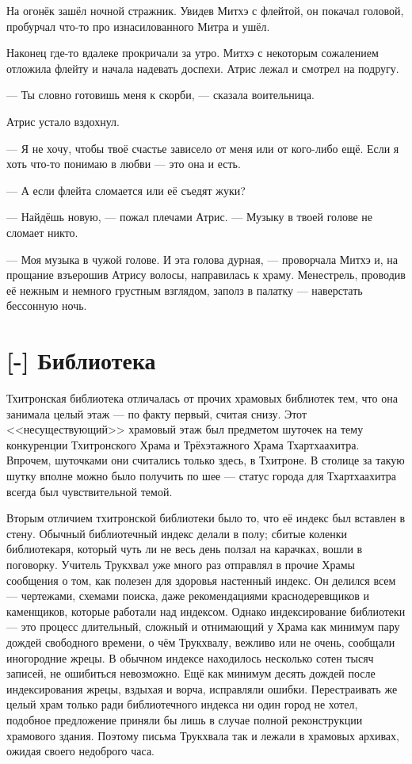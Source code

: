 На огонёк зашёл ночной стражник.
Увидев Митхэ с флейтой, он покачал головой, пробурчал что-то про изнасилованного Митра и ушёл.

Наконец где-то вдалеке прокричали за утро.
Митхэ с некоторым сожалением отложила флейту и начала надевать доспехи.
Атрис лежал и смотрел на подругу.

--- Ты словно готовишь меня к скорби, --- сказала воительница.

Атрис устало вздохнул.

--- Я не хочу, чтобы твоё счастье зависело от меня или от кого-либо ещё.
Если я хоть что-то понимаю в любви --- это она и есть.

--- А если флейта сломается или её съедят жуки?

--- Найдёшь новую, --- пожал плечами Атрис.
--- Музыку в твоей голове не сломает никто.

--- Моя музыка в чужой голове.
И эта голова дурная, --- проворчала Митхэ и, на прощание взъерошив Атрису волосы, направилась к храму.
Менестрель, проводив её нежным и немного грустным взглядом, заполз в палатку --- наверстать бессонную ночь.

\section{[-] Библиотека}

Тхитронская библиотека отличалась от прочих храмовых библиотек тем, что она занимала целый этаж --- по факту первый, считая снизу.
Этот <<несуществующий>> храмовый этаж был предметом шуточек на тему конкуренции Тхитронского Храма и Трёхэтажного Храма Тхартхаахитра.
Впрочем, шуточками они считались только здесь, в Тхитроне.
В столице за такую шутку вполне можно было получить по шее --- статус города для Тхартхаахитра всегда был чувствительной темой.

Вторым отличием тхитронской библиотеки было то, что её индекс был вставлен в стену.
Обычный библиотечный индекс делали в полу;
сбитые коленки библиотекаря, который чуть ли не весь день ползал на карачках, вошли в поговорку.
Учитель Трукхвал уже много раз отправлял в прочие Храмы сообщения о том, как полезен для здоровья настенный индекс.
Он делился всем --- чертежами, схемами поиска, даже рекомендациями краснодеревщиков и каменщиков, которые работали над индексом.
Однако индексирование библиотеки --- это процесс длительный, сложный и отнимающий у Храма как минимум пару дождей свободного времени, о чём Трукхвалу, вежливо или не очень, сообщали иногородние жрецы.
В обычном индексе находилось несколько сотен тысяч записей, не ошибиться невозможно.
Ещё как минимум десять дождей после индексирования жрецы, вздыхая и ворча, исправляли ошибки.
Перестраивать же целый храм только ради библиотечного индекса ни один город не хотел, подобное предложение приняли бы лишь в случае полной реконструкции храмового здания.
Поэтому письма Трукхвала так и лежали в храмовых архивах, ожидая своего недоброго часа.

